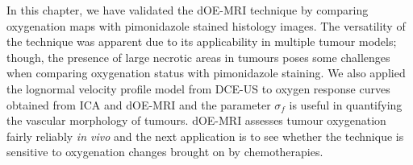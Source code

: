 In this chapter, we have validated the \acs{dOE-MRI} technique by comparing oxygenation maps with pimonidazole stained histology images. 
The versatility of the technique was apparent due to its applicability in multiple tumour models; though, the presence of large necrotic areas in tumours poses some challenges when comparing oxygenation status with pimonidazole staining.
We also applied the lognormal velocity profile model from \acs{DCE-US} to oxygen response curves obtained from \acs{ICA} and \acs{dOE-MRI} and the parameter $\sigma_f$ is useful in quantifying the vascular morphology of tumours.
\acs{dOE-MRI} assesses tumour oxygenation fairly reliably \emph{in vivo} and the next application is to see whether the technique is sensitive to oxygenation changes brought on by chemotherapies.

%

%

%